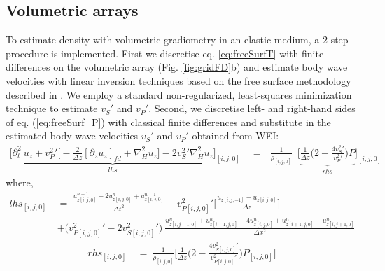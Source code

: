 \documentclass[]{article}
\begin{document}
	
	\subsection{Volumetric arrays} \label{methV}
	
	To estimate density with volumetric gradiometry in an elastic medium, a 2-step procedure is implemented. First we discretise eq. \eqref{eq:freeSurfT} with finite differences on the volumetric array (Fig. \ref{fig:gridFD}b) and estimate body wave velocities with linear inversion techniques based on the free surface methodology described in \textcite{curtis2002volumetric}. We employ a standard non-regularized, least-squares minimization technique to estimate $v_{S}\prime$ and $v_{P}\prime$. 
	Second, we discretise left- and right-hand sides of eq. (\ref{eq:freeSurf_P}) with classical finite differences and substitute in the estimated body wave velocities $v_{S}\prime$ and $v_{P}\prime$ obtained from WEI:
	\begin{align} 
		\Bigg[\underbrace{\partial_{t}^{2} \: u_{z}  +  v_{P}^{2}\prime \Big[ - \frac{2}{\Delta z}  [\partial_{z} u_{z}]_{fd} +  \nabla_{H}^{2}u_{z} \Big] - 2 v_{S}^{2}\prime \nabla_{H}^{2}u_{z}}_\text{$lhs$}\Bigg]_{[i,j,0]}  \: &=  \: \: \: \frac{1}{\rho_{[i,j,0]}} \: \;  \Bigg[ \underbrace{\frac{1}{\Delta z} \Big( 2 - \frac{4v_{S}^{2}\prime}{v_{P}^{2}\prime}\Big) P}_\text{$rhs$}\Bigg]_{[i,j,0]}
		\label{eq:freeSurf_P2}   
	\end{align}
	where,
	\begin{align} 
		lhs_{[i,j,0]} \:&=\:  \frac{ u_{z[i,j,0]}^{n+1} - 2u_{z[i,j,0]}^{n} + u_{z[i,j,0]}^{n-1} }{\Delta t^{2}} + v_{P[i,j,0]}^{2}\prime \Bigg[ \frac{u_{z [i,j,-1]}-u_{z [i,j,0]}}{\Delta z}\Bigg] \nonumber\\
		&+ \Big(v_{P[i,j,0]}^{2}\prime - 2v_{S [i,j,0]}^{2}\prime \Big) \: \frac{ u_{z[i,j-1,0]}^{n} + u_{z[i-1,j,0]}^{n} - 4u_{z[i,j,0]}^{n} + u_{z[i+1,j,0]}^{n} + u_{z[i,j+1,0]}^{n}}{\Delta x^{2}}
	\label{eq:FS_discr_LHS} 
	\end{align}
	\begin{align} 
		rhs_{[i,j,0]} \:&=\: \frac{1}{\rho_{[i,j,0]}}  \Bigg[\frac{1}{\Delta z} \Big(2-\frac{4v_{S[i,j,0]}^{2}\prime }{v_{P[i,j,0]}^{2}\prime } \Big) P_{[i,j,0]} \Bigg]
		\label{eq:FS_discr_RHS}   
	\end{align}
	
\end{document}
